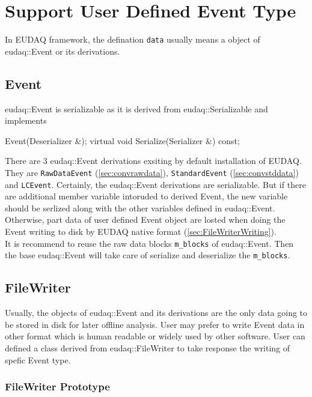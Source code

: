 \section{Support User Defined Event Type}\label{sec:NewDataHandling}
In EUDAQ framework, the defination \texttt{data} usually means a object of eudaq::Event or its derivations. 

\subsection{Event}
eudaq::Event is serializable as it is derived from eudaq::Serializable and implements
\begin{listing}
  Event(Deserializer &);
  virtual void Serialize(Serializer &) const;    
\end{listing}

There are 3 eudaq::Event derivations exsiting by default installation of EUDAQ. They are \lstinline[style=cpp]{RawDataEvent} (\autoref{sec:convrawdata}), \lstinline[style=cpp]{StandardEvent} (\autoref{sec:convstddata}) and \lstinline[style=cpp]{LCEvent}. Certainly, the eudaq::Event derivations are serializable. But if there are additional member variable intoruded to derived Event, the new variable should be serlized along with the other variables defined in eudaq::Event. Otherwise, part data of user defined Event object are losted when doing the Event writing to disk by EUDAQ native format (\autoref{sec:FileWriterWriting}).\\

It is recommend to reuse the raw data blocks \lstinline[style=cpp]{m_blocks} of eudaq::Event. Then the base eudaq::Event will take care of serialize and deserialize the \lstinline[style=cpp]{m_blocks}.\\

\subsection{FileWriter}\label{sec:FileWriterWriting}
Usually, the objects of eudaq::Event and its derivations are the only data going to be stored in disk for later offline analysis. User may prefer to write Event data in other format which is human readable or widely used by other software. User can defined a class derived from eudaq::FileWriter to take response the writing of spefic Event type.

\subsubsection{FileWriter Prototype}



